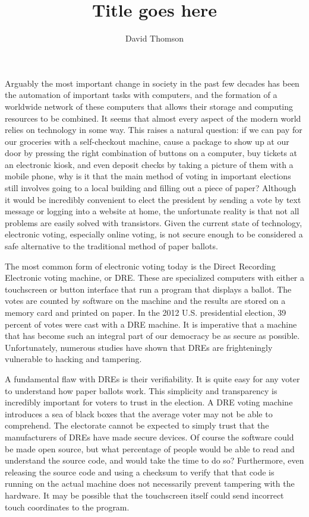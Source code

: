 \documentclass[12pt, titlepage]{article}
\begin{document}
\title{Title goes here}
\author{David Thomson}
\maketitle

Arguably the most important change in society in the past few decades has been the automation of important tasks with computers, and the formation of a worldwide network of these computers that allows their storage and computing resources to be combined. It seems that almost every aspect of the modern world relies on technology in some way. This raises a natural question: if we can pay for our groceries with a self-checkout machine, cause a package to show up at our door by pressing the right combination of buttons on a computer, buy tickets at an electronic kiosk, and even deposit checks by taking a picture of them with a mobile phone, why is it that the main method of voting in important elections still involves going to a local building and filling out a piece of paper? Although it would be incredibly convenient to elect the president by sending a vote by text message or logging into a website at home, the unfortunate reality is that not all problems are easily solved with transistors. Given the current state of technology, electronic voting, especially online voting, is not secure enough to be considered a safe alternative to the traditional method of paper ballots.

The most common form of electronic voting today is the Direct Recording Electronic voting machine, or DRE. These are specialized computers with either a touchscreen or button interface that run a program that displays a ballot. The votes are counted by software on the machine and the results are stored on a memory card and printed on paper. In the 2012 U.S. presidential election, 39 percent of votes were cast with a DRE machine. \cite{kalb2015guide} It is imperative that a machine that has become such an integral part of our democracy be as secure as possible. Unfortunately, numerous studies have shown that DREs are frighteningly vulnerable to hacking and tampering.

A fundamental flaw with DREs is their verifiability. It is quite easy for any voter to understand how paper ballots work. This simplicity and transparency is incredibly important for voters to trust in the election. A DRE voting machine introduces a sea of black boxes that the average voter may not be able to comprehend. The electorate cannot be expected to simply trust that the manufacturers of DREs have made secure devices. Of course the software could be made open source, but what percentage of people would be able to read and understand the source code, and would take the time to do so? Furthermore, even releasing the source code and using a checksum to verify that that code is running on the actual machine does not necessarily prevent tampering with the hardware. It may be possible that the touchscreen itself could send incorrect touch coordinates to the program.
\end{document}
